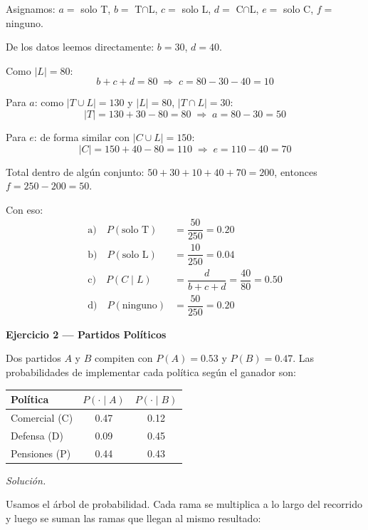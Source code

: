 \documentclass[12pt,letterpaper]{article}
\begin{document}
Asignamos: $a=$ solo T, $b=$ T$\cap$L, $c=$ solo L,
$d=$ C$\cap$L, $e=$ solo C, $f=$ ninguno.

De los datos leemos directamente: $b = 30$, $d = 40$.

Como $|L| = 80$:
\[
  b + c + d = 80 \;\Rightarrow\; c = 80 - 30 - 40 = 10
\]

Para $a$: como $|T \cup L| = 130$ y $|L| = 80$, $|T \cap L| = 30$:
\[
  |T| = 130 + 30 - 80 = 80 \;\Rightarrow\; a = 80 - 30 = 50
\]

Para $e$: de forma similar con $|C \cup L| = 150$:
\[
  |C| = 150 + 40 - 80 = 110 \;\Rightarrow\; e = 110 - 40 = 70
\]

Total dentro de algún conjunto: $50+30+10+40+70 = 200$, entonces $f = 250-200 = 50$.

\medskip
Con eso:
\begin{align*}
\text{a)}\quad P(\text{solo T}) &= \dfrac{50}{250} = 0.20 \\[6pt]
\text{b)}\quad P(\text{solo L}) &= \dfrac{10}{250} = 0.04 \\[6pt]
\text{c)}\quad P(C \mid L)      &= \dfrac{d}{b+c+d} = \dfrac{40}{80} = 0.50 \\[6pt]
\text{d)}\quad P(\text{ninguno})&= \dfrac{50}{250} = 0.20
\end{align*}

\bigskip

\textbf{Ejercicio 2 — Partidos Políticos}

\medskip
Dos partidos $A$ y $B$ compiten con $P(A)=0.53$ y $P(B)=0.47$.
Las probabilidades de implementar cada política según el ganador son:

\begin{center}
\begin{tabular}{lcc}
\hline
Política & $P(\cdot\mid A)$ & $P(\cdot\mid B)$ \\
\hline
Comercial (C)  & 0.47 & 0.12 \\
Defensa (D)    & 0.09 & 0.45 \\
Pensiones (P)  & 0.44 & 0.43 \\
\hline
\end{tabular}
\end{center}

\medskip
\textit{Solución.}

Usamos el árbol de probabilidad. Cada rama se multiplica a lo largo del recorrido
y luego se suman las ramas que llegan al mismo resultado:
\end{document}

